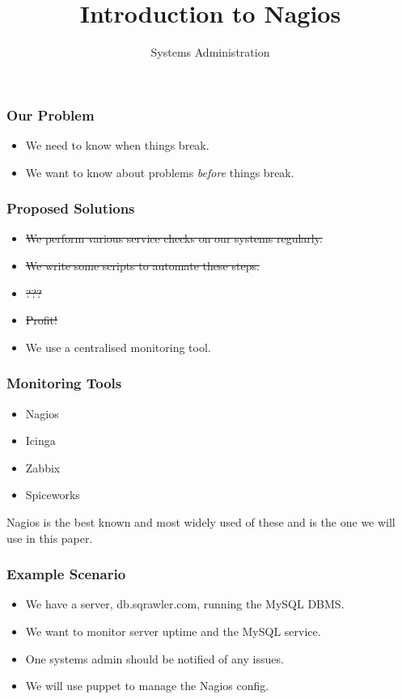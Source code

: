 \documentclass[10pt]{beamer}
\title{Introduction to Nagios}
\author[IN719]{Systems Administration}
\institute[Otago Polytechnic]{
  Otago Polytechnic \\
  Dunedin, New Zealand \\
}
\date{}
\begin{document}
\begin{frame}[plain]
  \titlepage
\end{frame}

\begin{frame}
  \frametitle{Our Problem}
  
\begin{itemize}
\item We need to know when things break. 
\item We want to know about problems \emph{before} things break.
\end{itemize}
\end{frame}


\begin{frame}
  \frametitle{Proposed Solutions}
  
\begin{itemize}
\item \sout{We perform various service checks on our systems regularly.} 
\item \sout{We write some scripts to automate these steps.}
\item \sout{???}
\item \sout{Profit!}
\item We use a centralised monitoring tool.
\end{itemize}
\end{frame}


\begin{frame}
  \frametitle{Monitoring Tools}
  
\begin{itemize}
\item Nagios
\item Icinga
\item Zabbix
\item Spiceworks
\end{itemize}

Nagios is the best known and most widely used of these and is the one we will use in this paper.
\end{frame}


\begin{frame}
  \frametitle{Example Scenario}
  
\begin{itemize}
\item We have a server, db.sqrawler.com,  running the MySQL DBMS.
\item We want to monitor server uptime and the MySQL service.
\item One systems admin should be notified of any issues.
\item We will use puppet to manage the Nagios config.
\end{itemize}

\end{frame}
\end{document}
